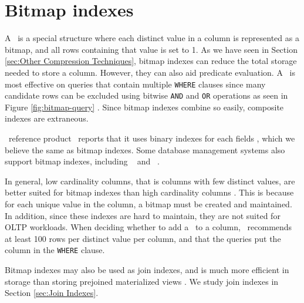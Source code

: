 \section{Bitmap indexes}
\label{sec:Bitmap indexes}
A \biti~is a special structure where each distinct value in a column is represented as a bitmap, and all rows containing that value is set to 1. As we have seen in Section \ref{sec:Other Compression Techniques}, bitmap indexes can reduce the total storage needed to store a column. However, they can also aid predicate evaluation. A \biti~is most effective on queries that contain multiple \texttt{WHERE} clauses since many candidate rows can be excluded using bitwise \texttt{AND} and \texttt{OR} operations as seen in Figure \ref{fig:bitmap-query} \cite{noauthor_undated-hp}. Since bitmap indexes combine so easily, composite indexes are extraneous. 

\genusSoftware~reference product \qlikview~reports that it uses binary indexes for each fields \cite{Qlik2011-ef}, which we believe the same as bitmap indexes. Some database management systems also support bitmap indexes, including \oracle~\cite{noauthor_undated-hp} and \ibm~\cite{Raman2013-em}.

In general, low cardinality columns, that is columns with few distinct values, are better suited for bitmap indexes than high cardinality columns \cite{noauthor_undated-hp}. This is because for each unique value in the column, a bitmap must be created and maintained. In addition, since these indexes are hard to maintain, they are not suited for OLTP workloads. When deciding whether to add a \biti~to a column, \oracle~recommends at least 100 rows per distinct value per column, and that the queries put the column in the \texttt{WHERE} clause.

Bitmap indexes may also be used as join indexes, and is much more efficient in storage than storing prejoined materialized views \cite{noauthor_undated-hp}. We study join indexes in Section \ref{sec:Join Indexes}.


